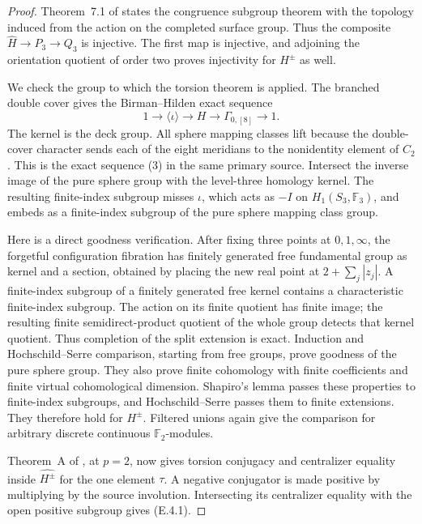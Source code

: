 \begin{proof}
Theorem~7.1 of \cite{CEBoggiHyperelliptic2024} states the
congruence subgroup theorem with the topology induced from
the action on the completed surface group.  Thus the
composite $\widehat H\to P_3\to Q_3$ is injective.  The first
map is injective, and adjoining the orientation quotient of
order two proves injectivity for $H^{\pm}$ as well.

We check the group to which the torsion theorem is applied.
The branched double cover gives the Birman--Hilden exact
sequence
\[
 1\longrightarrow\langle\iota\rangle\longrightarrow H
       \longrightarrow\Gamma_{0,[8]}\longrightarrow1.
                                                               \tag{E.4.2}
\]
The kernel is the deck group.  All sphere mapping classes
lift because the double-cover character sends each of the
eight meridians to the nonidentity element of $C_2$.
This is the exact sequence (3) in the same primary source.
Intersect the inverse image of the pure sphere group with
the level-three homology kernel.  The resulting finite-index
subgroup misses $\iota$, which acts as $-I$ on
$H_1(S_3,\mathbb F_3)$, and embeds as a finite-index subgroup
of the pure sphere mapping class group.

Here is a direct goodness verification.  After fixing three
points at $0,1,\infty$, the forgetful configuration fibration
has finitely generated free fundamental group as kernel and
a section, obtained by placing the new real point at
$2+\sum_j|z_j|$.  A finite-index subgroup of a finitely
generated free kernel contains a characteristic finite-index
subgroup.  The action on its finite quotient has finite image;
the resulting finite semidirect-product quotient of the whole
group detects that kernel quotient.  Thus completion of the
split extension is exact.  Induction and Hochschild--Serre
comparison, starting from free groups, prove goodness of
the pure sphere group.  They also prove finite cohomology
with finite coefficients and finite virtual cohomological
dimension.  Shapiro's lemma passes these properties to
finite-index subgroups, and Hochschild--Serre passes them to
finite extensions.  They therefore hold for $H^{\pm}$.
Filtered unions again give the comparison for arbitrary
discrete continuous $\mathbb F_2$-modules.

Theorem~A of \cite{CEBoggiZalesskii2025}, at $p=2$, now
gives torsion conjugacy and centralizer equality inside
$\widehat{H^{\pm}}$ for the one element $\tau$.  A negative
conjugator is made positive by multiplying by the source
involution.  Intersecting its centralizer equality with the
open positive subgroup gives (E.4.1).


\end{proof}
